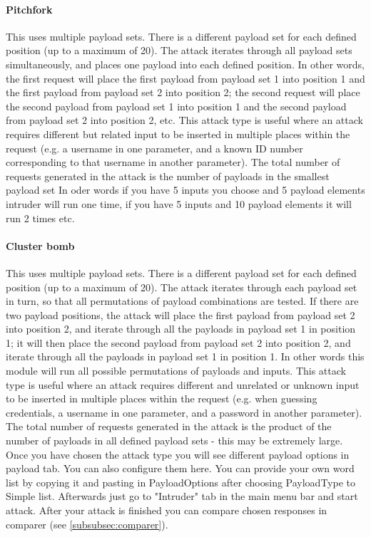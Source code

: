 \documentclass{article}[12pt]
\begin{document}
\paragraph{Pitchfork}
This uses multiple payload sets.
There is a different payload set for each defined position (up to a maximum of 20).
The attack iterates through all payload sets simultaneously, and places one payload into each defined position.
In other words, the first request will place the first payload from payload set 1 into position 1 and the first payload from payload set 2 into position 2;
the second request will place the second payload from payload set 1 into position 1 and the second payload from payload set 2 into position 2, etc.
This attack type is useful where an attack requires different but related input to be inserted in multiple places within the request (e.g. a username in one parameter, and a known ID number corresponding to that username in another parameter).
The total number of requests generated in the attack is the number of payloads in the smallest payload set
In oder words if you have 5 inputs you choose and 5  payload elements intruder will run one time, if you have 5 inputs and 10 payload elements it will run 2 times etc.
\paragraph{Cluster bomb}
This uses multiple payload sets.
There is a different payload set for each defined position (up to a maximum of 20).
The attack iterates through each payload set in turn, so that all permutations of payload combinations are tested.
If there are two payload positions, the attack will place the first payload from payload set 2 into position 2, and iterate through all the payloads in payload set 1 in position 1;
it will then place the second payload from payload set 2 into position 2, and iterate through all the payloads in payload set 1 in position 1.
In other words this module will run all possible permutations of payloads and inputs.
This attack type is useful where an attack requires different and unrelated or unknown input to be inserted in multiple places within the request (e.g. when guessing credentials, a username in one parameter, and a password in another parameter).
The total number of requests generated in the attack is the product of the number of payloads in all defined payload sets - this may be extremely large.
\newline
Once you have chosen the attack type you will see different payload options in payload tab.
You can also configure them here.
You can provide your own word list by copying it and pasting in PayloadOptions after choosing PayloadType to Simple list.
Afterwards just go to "Intruder" tab in the main menu bar and start attack.
After your attack is finished you can compare chosen responses in comparer (see \ref{subsubsec:comparer}).
\end{document}
